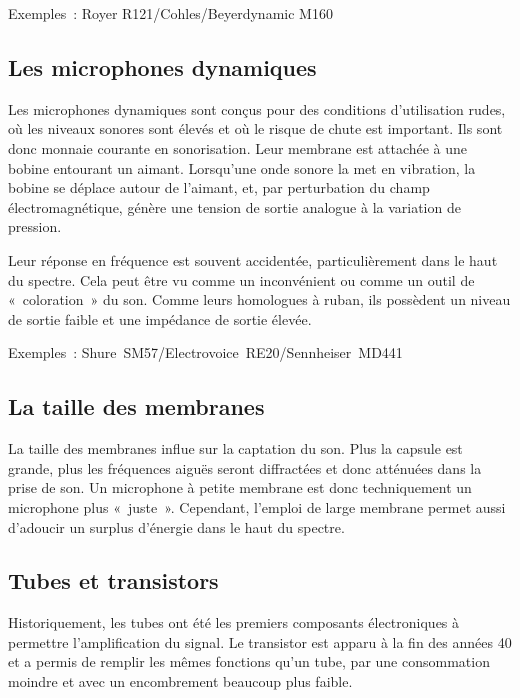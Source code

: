 \documentclass[
]{book}
\begin{document}
Exemples~: Royer R121/Cohles/Beyerdynamic M160

\hypertarget{les-microphones-dynamiques}{%
\subsection{Les microphones dynamiques}\label{les-microphones-dynamiques}}

Les microphones dynamiques sont conçus pour des conditions d'utilisation rudes, où les niveaux sonores sont élevés et où le risque de chute est important. Ils sont donc monnaie courante en sonorisation. Leur membrane est attachée à une bobine entourant un aimant. Lorsqu'une onde sonore la met en vibration, la bobine se déplace autour de l'aimant, et, par perturbation du champ électromagnétique, génère une tension de sortie analogue à la variation de pression.

Leur réponse en fréquence est souvent accidentée, particulièrement dans le haut du spectre. Cela peut être vu comme un inconvénient ou comme un outil de «~coloration~» du son. Comme leurs homologues à ruban, ils possèdent un niveau de sortie faible et une impédance de sortie élevée.

Exemples~: Shure~SM57/Electrovoice~RE20/Sennheiser~MD441

\hypertarget{la-taille-des-membranes}{%
\subsection{La taille des membranes}\label{la-taille-des-membranes}}

La taille des membranes influe sur la captation du son. Plus la capsule est grande, plus les fréquences aiguës seront diffractées et donc atténuées dans la prise de son. Un microphone à petite membrane est donc techniquement un microphone plus «~juste~». Cependant, l'emploi de large membrane permet aussi d'adoucir un surplus d'énergie dans le haut du spectre.

\hypertarget{tubes-et-transistors}{%
\subsection{Tubes et transistors}\label{tubes-et-transistors}}

Historiquement, les tubes ont été les premiers composants électroniques à permettre l'amplification du signal. Le transistor est apparu à la fin des années 40 et a permis de remplir les mêmes fonctions qu'un tube, par une consommation moindre et avec un encombrement beaucoup plus faible.
\end{document}

